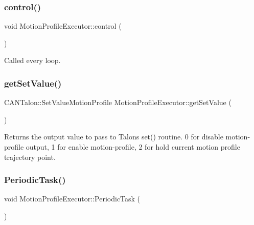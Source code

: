 \subsubsection{\texorpdfstring{control()}{control()}}
{\footnotesize\ttfamily void Motion\+Profile\+Executor\+::control (\begin{DoxyParamCaption}{ }\end{DoxyParamCaption})\hspace{0.3cm}{\ttfamily [inline]}}

Called every loop. \mbox{\label{class_motion_profile_executor_aad1297807d386b66246ca4154e136485}} 
\subsubsection{\texorpdfstring{get\+Set\+Value()}{getSetValue()}}
{\footnotesize\ttfamily C\+A\+N\+Talon\+::\+Set\+Value\+Motion\+Profile Motion\+Profile\+Executor\+::get\+Set\+Value (\begin{DoxyParamCaption}{ }\end{DoxyParamCaption})\hspace{0.3cm}{\ttfamily [inline]}}

\begin{DoxyReturn}{Returns}
the output value to pass to Talon\textquotesingle{}s set() routine. 0 for disable motion-\/profile output, 1 for enable motion-\/profile, 2 for hold current motion profile trajectory point. 
\end{DoxyReturn}
\mbox{\label{class_motion_profile_executor_a6599521948ebfd609d9b4c53539f597f}} 
\subsubsection{\texorpdfstring{Periodic\+Task()}{PeriodicTask()}}
{\footnotesize\ttfamily void Motion\+Profile\+Executor\+::\+Periodic\+Task (\begin{DoxyParamCaption}{ }\end{DoxyParamCaption})\hspace{0.3cm}{\ttfamily [inline]}}

